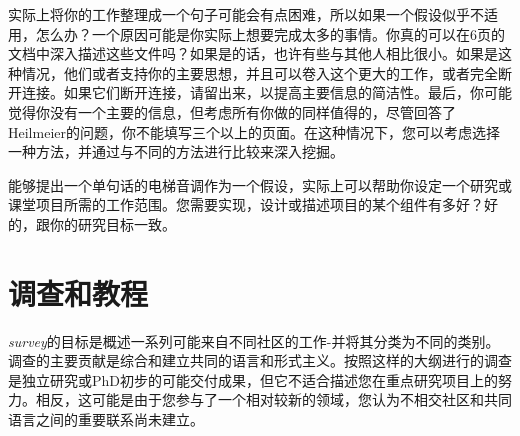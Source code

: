 实际上将你的工作整理成一个句子可能会有点困难，所以如果一个假设似乎不适用，怎么办？一个原因可能是你实际上想要完成太多的事情。你真的可以在6页的文档中深入描述这些文件吗？如果是的话，也许有些与其他人相比很小。如果是这种情况，他们或者支持你的主要思想，并且可以卷入这个更大的工作，或者完全断开连接。如果它们断开连接，请留出来，以提高主要信息的简洁性。最后，你可能觉得你没有一个主要的信息，但考虑所有你做的同样值得的，尽管回答了Heilmeier的问题，你不能填写三个以上的页面。在这种情况下，您可以考虑选择一种方法，并通过与不同的方法进行比较来深入挖掘。

能够提出一个单句话的电梯音调作为一个假设，实际上可以帮助你设定一个研究或课堂项目所需的工作范围。您需要实现，设计或描述项目的某个组件有多好？好的，跟你的研究目标一致。




\section{调查和教程}
\emph{survey}的目标是概述一系列可能来自不同社区的工作-并将其分类为不同的类别。调查的主要贡献是综合和建立共同的语言和形式主义。按照这样的大纲进行的调查是独立研究或PhD初步的可能交付成果，但它不适合描述您在重点研究项目上的努力。相反，这可能是由于您参与了一个相对较新的领域，您认为不相交社区和共同语言之间的重要联系尚未建立。

